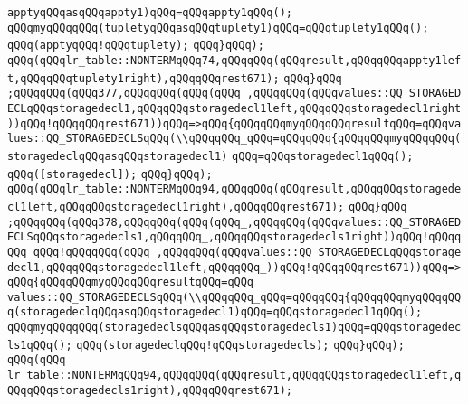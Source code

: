 \verb|apptyqQQqasqQQqappty1)qQQq=qQQqappty1qQQq();|\newline
\verb|qQQqmyqQQqqQQq(tupletyqQQqasqQQqtuplety1)qQQq=qQQqtuplety1qQQq();|\newline
\verb|qQQq(apptyqQQq!qQQqtuplety);|\newline
\verb|qQQq}qQQq);|\newline
\verb|qQQq(qQQqlr_table::NONTERMqQQq74,qQQqqQQq(qQQqresult,qQQqqQQqappty1left,qQQqqQQqtuplety1right),qQQqqQQqrest671);|\newline
\verb|qQQq}qQQq|\newline
\verb|;qQQqqQQq(qQQq377,qQQqqQQq(qQQq(qQQq_,qQQqqQQq(qQQqvalues::QQ_STORAGEDECLqQQqstoragedecl1,qQQqqQQqstoragedecl1left,qQQqqQQqstoragedecl1right))qQQq!qQQqqQQqrest671))qQQq=>qQQq{qQQqqQQqmyqQQqqQQqresultqQQq=qQQqvalues::QQ_STORAGEDECLSqQQq(\\qQQqqQQq_qQQq=qQQqqQQq{qQQqqQQqmyqQQqqQQq(storagedeclqQQqasqQQqstoragedecl1)|\newline
\verb|qQQq=qQQqstoragedecl1qQQq();|\newline
\verb|qQQq([storagedecl]);|\newline
\verb|qQQq}qQQq);|\newline
\verb|qQQq(qQQqlr_table::NONTERMqQQq94,qQQqqQQq(qQQqresult,qQQqqQQqstoragedecl1left,qQQqqQQqstoragedecl1right),qQQqqQQqrest671);|\newline
\verb|qQQq}qQQq|\newline
\verb|;qQQqqQQq(qQQq378,qQQqqQQq(qQQq(qQQq_,qQQqqQQq(qQQqvalues::QQ_STORAGEDECLSqQQqstoragedecls1,qQQqqQQq_,qQQqqQQqstoragedecls1right))qQQq!qQQqqQQq_qQQq!qQQqqQQq(qQQq_,qQQqqQQq(qQQqvalues::QQ_STORAGEDECLqQQqstoragedecl1,qQQqqQQqstoragedecl1left,qQQqqQQq_))qQQq!qQQqqQQqrest671))qQQq=>qQQq{qQQqqQQqmyqQQqqQQqresultqQQq=qQQq|\newline
\verb|values::QQ_STORAGEDECLSqQQq(\\qQQqqQQq_qQQq=qQQqqQQq{qQQqqQQqmyqQQqqQQq(storagedeclqQQqasqQQqstoragedecl1)qQQq=qQQqstoragedecl1qQQq();|\newline
\verb|qQQqmyqQQqqQQq(storagedeclsqQQqasqQQqstoragedecls1)qQQq=qQQqstoragedecls1qQQq();|\newline
\verb|qQQq(storagedeclqQQq!qQQqstoragedecls);|\newline
\verb|qQQq}qQQq);|\newline
\verb|qQQq(qQQq|\newline
\verb|lr_table::NONTERMqQQq94,qQQqqQQq(qQQqresult,qQQqqQQqstoragedecl1left,qQQqqQQqstoragedecls1right),qQQqqQQqrest671);|\newline
